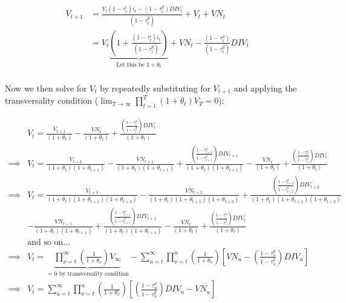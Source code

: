 \begin{equation}
\label{eqn:v_t1}
\begin{split}
V_{t+1}&=\frac{V_{t}(1-\tau^{i}_{t})i_{t}-(1-\tau^{d}_{t})DIV_{t}}{(1-\tau^{g}_{t})}+V_{t}+VN_{t} \\
 & = V_{t}\underbrace{\left(1+\frac{(1-\tau^{i}_{t})i_{t}}{(1-\tau^{g}_{t})}\right)}_{\text{Let this be }1+\theta_{t}} + VN_{t} - \frac{(1-\tau^{d}_{t})}{(1-\tau^{g}_{t})}DIV_{t} \\
\end{split}
\end{equation}

\noindent\noindent Now we then solve for $V_{t}$ by repeatedly substituting for $V_{t+1}$ and applying the transversality condition ($\lim_{T \to \infty} \prod_{t=1}^{T}(1+\theta_{t})V_{T}=0$):

\begin{equation}
\label{eqn:solve_vs}
\begin{split}
& V_{t}=\frac{V_{t+1}}{(1+\theta_{t})} - \frac{VN_{t}}{(1+\theta_{t})}  + \frac{\left(\frac{1-\tau^{d}_{t}}{1-\tau^{g}_{t}}\right)DIV_{t}}{(1+\theta_{t})} \\
\implies &  V_{t}=\frac{V_{t+2}}{(1+\theta_{t})(1+\theta_{t+1})} - \frac{VN_{t+1}}{(1+\theta_{t})(1+\theta_{t+1})}  + \frac{\left(\frac{1-\tau^{d}_{t+1}}{1-\tau^{g}_{t+1}}\right)DIV_{t+1}}{(1+\theta_{t})(1+\theta_{t+1})} - \frac{VN_{t}}{(1+\theta_{t})}  + \frac{\left(\frac{1-\tau^{d}_{t}}{1-\tau^{g}_{t}}\right)DIV_{t}}{(1+\theta_{t})} \\
\implies &  V_{t}= \frac{V_{t+3}}{(1+\theta_{t})(1+\theta_{t+1})(1+\theta_{t+2})} - \frac{VN_{t+2}}{(1+\theta_{t})(1+\theta_{t+1})(1+\theta_{t+2})}  + \frac{\left(\frac{1-\tau^{d}_{t+2}}{1-\tau^{g}_{t+2}}\right)DIV_{t+2}}{(1+\theta_{t})(1+\theta_{t+1})(1+\theta_{t+2})} \\
& - \frac{VN_{t+1}}{(1+\theta_{t})(1+\theta_{t+1})}  + \frac{\left(\frac{1-\tau^{d}_{t+1}}{1-\tau^{g}_{t+1}}\right)DIV_{t+1}}{(1+\theta_{t})(1+\theta_{t+1})} - \frac{VN_{t}}{(1+\theta_{t})}  + \frac{\left(\frac{1-\tau^{d}_{t}}{1-\tau^{g}_{t}}\right)DIV_{t}}{(1+\theta_{t})} \\
& \text{and so on...} \\
\implies & V_{t}=\underbrace{\prod_{\nu=t}^{\infty}\left(\frac{1}{1+\theta_{\nu}}\right)V_{\infty}}_{=0 \text{ by transversality condition}} - \sum_{u=t}^{\infty} \prod_{\nu=t}^{u}\left(\frac{1}{1+\theta_{\nu}}\right)\left[VN_{u} - \left(\frac{1-\tau^{d}_{u}}{1-\tau^{g}_{u}}\right)DIV_{u}\right]\\
\implies & V_{t}= \sum_{u=t}^{\infty} \prod_{\nu=t}^{u}\left(\frac{1}{1+\theta_{\nu}}\right)\left[ \left(\frac{1-\tau^{d}_{u}}{1-\tau^{g}_{u}}\right)DIV_{u}-VN_{u}\right]\\
\end{split}
\end{equation}

